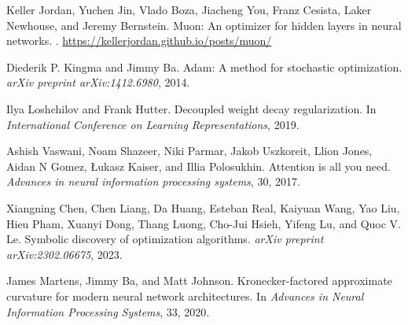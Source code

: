 \documentclass[11pt,a4paper]{article}
\begin{document}
\begin{thebibliography}{9}

Keller Jordan, Yuchen Jin, Vlado Boza, Jiacheng You, Franz Cesista, Laker Newhouse, and Jeremy Bernstein.
\newblock Muon: An optimizer for hidden layers in neural networks.
.
\newblock \url{https://kellerjordan.github.io/posts/muon/}

Diederik P. Kingma and Jimmy Ba.
\newblock Adam: A method for stochastic optimization.
\newblock \textit{arXiv preprint arXiv:1412.6980}, 2014.

Ilya Loshchilov and Frank Hutter.
\newblock Decoupled weight decay regularization.
\newblock In \textit{International Conference on Learning Representations}, 2019.

Ashish Vaswani, Noam Shazeer, Niki Parmar, Jakob Uszkoreit, Llion Jones, Aidan N Gomez, Łukasz Kaiser, and Illia Polosukhin.
\newblock Attention is all you need.
\newblock \textit{Advances in neural information processing systems}, 30, 2017.

Xiangning Chen, Chen Liang, Da Huang, Esteban Real, Kaiyuan Wang, Yao Liu, Hieu Pham, Xuanyi Dong, Thang Luong, Cho-Jui Hsieh, Yifeng Lu, and Quoc V. Le.
\newblock Symbolic discovery of optimization algorithms.
\newblock \textit{arXiv preprint arXiv:2302.06675}, 2023.

James Martens, Jimmy Ba, and Matt Johnson.
\newblock Kronecker-factored approximate curvature for modern neural network architectures.
\newblock In \textit{Advances in Neural Information Processing Systems}, 33, 2020.

\end{thebibliography}
\end{document}
